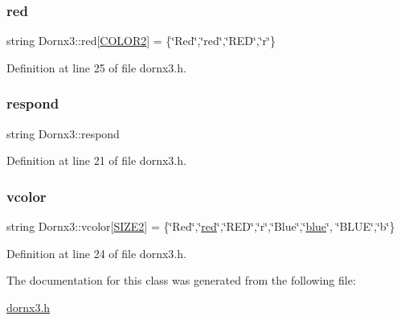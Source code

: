 \mbox{\label{class_dornx3_a556c86898a12bc10ff4a559d822cea1a}} 
\subsubsection{\texorpdfstring{red}{red}}
{\footnotesize\ttfamily string Dornx3\+::red\mbox{[}\hyperlink{dornx3_8h_afd1642892fe952b92046b3b290301c66}{C\+O\+L\+O\+R2}\mbox{]} = \{\char`\"{}Red\char`\"{},\char`\"{}red\char`\"{},\char`\"{}R\+ED\char`\"{},\char`\"{}r\char`\"{}\}}



Definition at line 25 of file dornx3.\+h.

\mbox{\label{class_dornx3_aa8cbadbae14b2e9a29e38ba9b0ed37ba}} 
\subsubsection{\texorpdfstring{respond}{respond}}
{\footnotesize\ttfamily string Dornx3\+::respond}



Definition at line 21 of file dornx3.\+h.

\mbox{\label{class_dornx3_a23ed936890f7aac31561df8819a5bb2e}} 
\subsubsection{\texorpdfstring{vcolor}{vcolor}}
{\footnotesize\ttfamily string Dornx3\+::vcolor\mbox{[}\hyperlink{dornx3_8h_abbca5f70b1b16867a3fd2f340a1fbdd9}{S\+I\+Z\+E2}\mbox{]} = \{\char`\"{}Red\char`\"{},\char`\"{}\hyperlink{class_dornx3_a556c86898a12bc10ff4a559d822cea1a}{red}\char`\"{},\char`\"{}R\+ED\char`\"{},\char`\"{}r\char`\"{},\char`\"{}Blue\char`\"{},\char`\"{}\hyperlink{class_dornx3_ad4294dbbc1608b76c5e49736b3bb8a86}{blue}\char`\"{}, \char`\"{}B\+L\+UE\char`\"{},\char`\"{}b\char`\"{}\}}



Definition at line 24 of file dornx3.\+h.



The documentation for this class was generated from the following file\+:\begin{DoxyCompactItemize}
\item 
\hyperlink{dornx3_8h}{dornx3.\+h}\end{DoxyCompactItemize}
